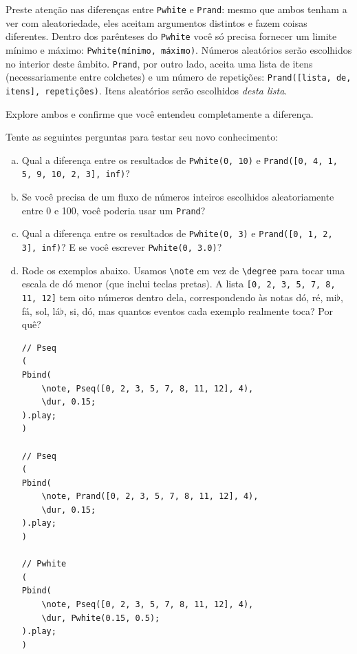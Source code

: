 Preste atenção nas diferenças entre \texttt{Pwhite} e \texttt{Prand}: mesmo que ambos tenham a ver com aleatoriedade, eles aceitam argumentos distintos e fazem coisas diferentes. Dentro dos parênteses do \texttt{Pwhite} você só precisa fornecer um limite mínimo e máximo: \texttt{Pwhite(mínimo, máximo)}. Números aleatórios serão escolhidos no interior deste âmbito. \texttt{Prand}, por outro lado, aceita uma lista de itens (necessariamente entre colchetes) e um número de repetições: \texttt{Prand([lista, de, itens], repetições)}. Itens aleatórios serão escolhidos \emph{desta lista}.

Explore ambos e confirme que você entendeu completamente a diferença.


\bigskip
{}
\bigskip
 


Tente as seguintes perguntas para testar seu novo conhecimento:

\begin{enumerate}[a)]
\item Qual a diferença entre os resultados de \texttt{Pwhite(0, 10)} e \texttt{Prand([0, 4, 1, 5, 9, 10, 2, 3], inf)}?

\item Se você precisa de um fluxo de números inteiros escolhidos aleatoriamente entre 0 e 100, você poderia usar um \texttt{Prand}?

\item Qual a diferença entre os resultados de \texttt{Pwhite(0, 3)} e \texttt{Prand([0, 1, 2, 3], inf)}? E se você escrever \texttt{Pwhite(0, 3.0)}?

\item  Rode os exemplos abaixo. Usamos \texttt{\textbackslash note} em vez de \texttt{\textbackslash degree} para tocar uma escala de dó menor (que inclui teclas pretas). A lista \texttt{[0, 2, 3, 5, 7, 8, 11, 12]} tem oito números dentro dela, correspondendo às notas dó, ré, mi$\flat$, fá, sol, lá$\flat$, si, dó, mas quantos eventos cada exemplo realmente toca? Por quê?

 
\begin{lstlisting}[style=SuperCollider-IDE, basicstyle=\scttfamily\footnotesize]
// Pseq
(
Pbind(
	\note, Pseq([0, 2, 3, 5, 7, 8, 11, 12], 4),
	\dur, 0.15;
).play;
)

// Pseq
(
Pbind(
	\note, Prand([0, 2, 3, 5, 7, 8, 11, 12], 4),
	\dur, 0.15;
).play;
)

// Pwhite
(
Pbind(
	\note, Pseq([0, 2, 3, 5, 7, 8, 11, 12], 4),
	\dur, Pwhite(0.15, 0.5);
).play;
)
\end{lstlisting}

\end{enumerate}


